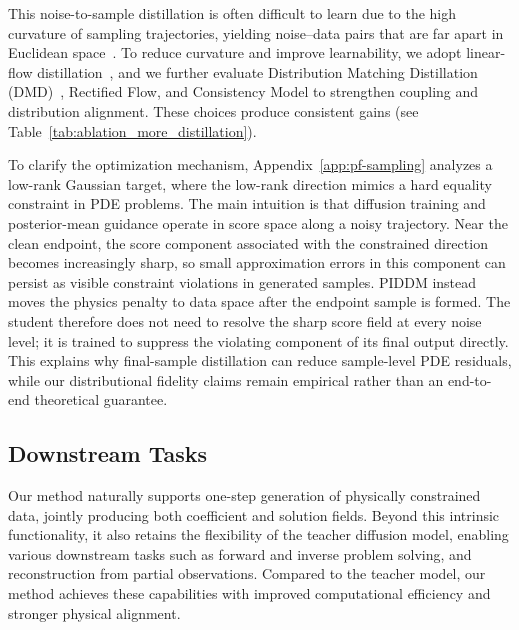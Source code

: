 \documentclass{article}
\theoremstyle{plain}
\theoremstyle{definition}
\theoremstyle{remark}
\begin{document}
This noise-to-sample distillation is often difficult to learn due to the high curvature of sampling trajectories, yielding noise–data pairs that are far apart in Euclidean space~\cite{liu2023instaflow}. To reduce curvature and improve learnability, we adopt linear-flow distillation~\cite{lipman2023flow, liu2023rectifiedflow}, and we further evaluate Distribution Matching Distillation (DMD)~\cite{yin2024dmd}, Rectified Flow, and Consistency Model \cite{song2023consistencymodels} to strengthen coupling and distribution alignment. These choices produce consistent gains (see Table~\ref{tab:ablation_more_distillation}).

To clarify the optimization mechanism, Appendix~\ref{app:pf-sampling} analyzes a low-rank Gaussian target, where the low-rank direction mimics a hard equality constraint in PDE problems. The main intuition is that diffusion training and posterior-mean guidance operate in score space along a noisy trajectory. Near the clean endpoint, the score component associated with the constrained direction becomes increasingly sharp, so small approximation errors in this component can persist as visible constraint violations in generated samples. PIDDM instead moves the physics penalty to data space after the endpoint sample is formed. The student therefore does not need to resolve the sharp score field at every noise level; it is trained to suppress the violating component of its final output directly. This explains why final-sample distillation can reduce sample-level PDE residuals, while our distributional fidelity claims remain empirical rather than an end-to-end theoretical guarantee.


\subsection{Downstream Tasks}\label{subsec:methods:downstream}

Our method naturally supports one-step generation of physically constrained data, jointly producing both coefficient and solution fields. Beyond this intrinsic functionality, it also retains the flexibility of the teacher diffusion model, enabling various downstream tasks such as forward and inverse problem solving, and reconstruction from partial observations. Compared to the teacher model, our method achieves these capabilities with improved computational efficiency and stronger physical alignment.
\end{document}
